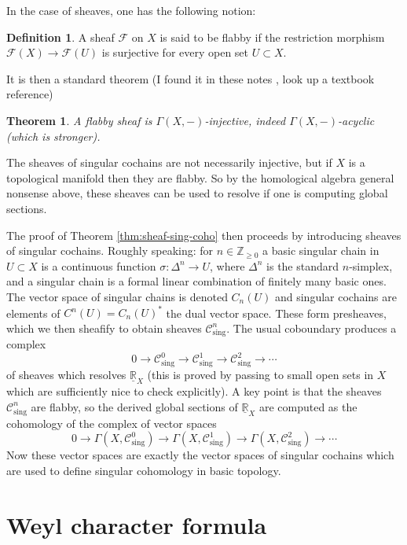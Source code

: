 \documentclass[12pt]{article}
\theoremstyle{plain}
\newtheorem{thm}{Theorem}[section]
\theoremstyle{definition}
\newtheorem{defn}{Definition}[section]
\numberwithin{equation}{section}
\newcommand{\D}{\Delta}
\newcommand{\R}{\mathbb{R}}
\newcommand{\Z}{\mathbb{Z}}
\newcommand{\CC}{\mathcal{C}}
\newcommand{\CF}{\mathcal{F}}
\begin{document}
In the case of sheaves, one has the following notion:
\begin{defn}
A sheaf $\CF$ on $X$ is said to be flabby if the restriction morphism $\CF(X) \rightarrow \CF(U)$ is surjective for every open set $U \subset X$.
\end{defn}

It is then a standard theorem (I found it in these notes {\cite[Proposition 6.9]{Viterbo}}, look up a textbook reference)
\begin{thm}
A flabby sheaf is $\Gamma(X, -)$-injective, indeed $\Gamma(X, -)$-acyclic (which is stronger).
\end{thm}


The sheaves of singular cochains are not necessarily injective, but if $X$ is a topological manifold then they are flabby. So by the homological algebra general nonsense above, these sheaves can be used to resolve if one is computing global sections.

The proof of Theorem \ref{thm:sheaf-sing-coho} then proceeds by introducing sheaves of singular cochains. Roughly speaking: for $n \in \Z_{\geq 0}$ a basic singular chain in $U \subset X$ is a continuous function $\sigma : \D^n \rightarrow U$, where $\D^n$ is the standard $n$-simplex, and a singular chain is a formal linear combination of finitely many basic ones. The vector space of singular chains is denoted $C_n(U)$ and singular cochains are elements of $C^n(U) = C_n(U)^*$ the dual vector space. These form presheaves, which we then sheafify to obtain sheaves $\CC^n_{\text{sing}}$. The usual coboundary produces a complex
\[
0 \rightarrow \CC^0_{\text{sing}} \rightarrow \CC^1_{\text{sing}}\rightarrow \CC^2_{\text{sing}} \rightarrow \cdots
\]
of sheaves which resolves $\underline{\R}_X$ (this is proved by passing to small open sets in $X$ which are sufficiently nice to check explicitly). A key point is that the sheaves $\CC^n_{\text{sing}}$ are flabby, so the derived global sections of $\underline{\R}_X$ are computed as the cohomology of the complex of vector spaces
\[
0 \rightarrow \Gamma(X, \CC^0_{\text{sing}}) \rightarrow \Gamma(X, \CC^1_{\text{sing}}) \rightarrow \Gamma(X, \CC^2_{\text{sing}}) \rightarrow \cdots
\]
Now these vector spaces are exactly the vector spaces of singular cochains which are used to define singular cohomology in basic topology.





\section{Weyl character formula}
\end{document}
